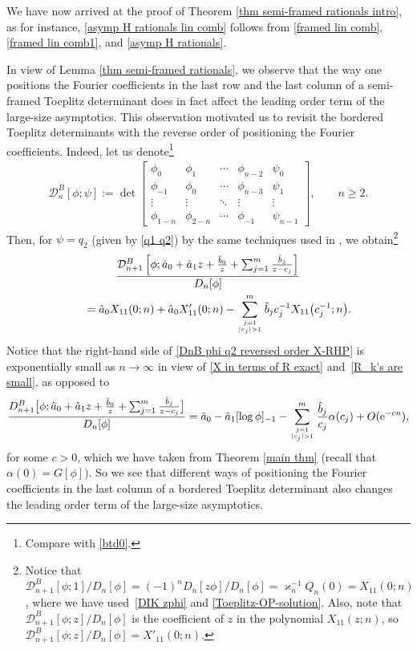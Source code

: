 \documentclass[pdftex]{sigma}
\numberwithin{equation}{section}
\newcommand{\al}{\alpha}
\begin{document}
We have now arrived at the proof of Theorem \ref{thm semi-framed rationals intro}, as for instance, \eqref{asymp H rationals lin comb} follows from \eqref{framed lin comb}, \eqref{framed lin comb1}, and \eqref{asymp H rationals}.
		
\begin{Remark}
In view of Lemma \ref{thm semi-framed rationals}, we observe that the way one positions the Fourier coefficients in the last row and the last column of a semi-framed Toeplitz determinant does in fact affect the leading order term of the large-size asymptotics. This observation motivated us to revisit the bordered Toeplitz determinants with the reverse order of positioning the Fourier coefficients. Indeed, let us denote\footnote{Compare with \eqref{btd0}.}
			\begin{gather*}%
				\mathcal{D}^{B}_{n}[\phi; \psi] := \det \begin{bmatrix}
					\phi_0& \phi_1 & \cdots & \phi_{n-2} & \psi_{0} \\
					\phi_{-1}& \phi_0 & \cdots & \phi_{n-3}&\psi_{1} \\
					\vdots & \vdots & \ddots & \vdots & \vdots\\
					\phi_{1-n} & \phi_{2-n} & \cdots & \phi_{-1}& \psi_{n-1}
				\end{bmatrix}, \qquad n \geq 2.
			\end{gather*}
			Then, for $\psi=q_2$ (given by \eqref{q1 q2}) by the same techniques used in \cite{BEGIL}, we obtain\footnote{Notice that $\mathcal{D}^{B}_{n+1}[\phi; 1]/D_n[\phi]=(-1)^{n}D_{n}[z\phi]/D_n[\phi] = \varkappa^{-1}_{n} Q_n(0) = X_{11}(0;n)$, where we have used~\eqref{DIK zphi} and \eqref{Toeplitz-OP-solution}. Also, note that $\mathcal{D}^{B}_{n+1}[\phi; z]/D_n[\phi]$ is the coefficient of $z$ in the polynomial $X_{11}(z;n)$, so $\mathcal{D}^{B}_{n+1}[\phi; z]/D_n[\phi] = X'_{11}(0;n)$.}
			\begin{gather}
				\frac{\mathcal{D}^{B}_{n+1}\left[\phi; \hat{a}_0+\hat{a}_1z+\tfrac{\hat{b}_0}{z}+	\sum_{j=1}^m \tfrac{\hat{b}_j}{z-c_j}\right]}{D_n[\phi]}\nonumber\\
\qquad = \hat{a}_0 X_{11}(0;n) + \hat{a}_0 X'_{11}(0;n) - \sum_{j=1 \atop |c_j|>1}^{m} \hat{b}_j c^{-1}_j X_{11}\big(c^{-1}_j;n\big).\label{DnB phi q2 reversed order X-RHP}
			\end{gather}
			Notice that the right-hand side of \eqref{DnB phi q2 reversed order X-RHP} is exponentially small as $n \to \infty$ in view of \eqref{X in terms of R exact} and~\eqref{R_k's are small}, as opposed to
			\begin{gather*}
				\frac{D^{B}_{n+1}\big[\phi; \hat{a}_0+\hat{a}_1z+\tfrac{\hat{b}_0}{z}+\sum_{j=1}^m \tfrac{\hat{b}_j}{z-c_j}\big]}{D_n[\phi]} = 			
				\hat{a}_0-\hat{a}_1[\log \phi]_{-1} -
				 \sum^{m}_{j=1 \atop |c_j|>1 } \frac{\hat{b}_j}{c_j} \al(c_j) + O({\rm e}^{-cn}),
			\end{gather*}
			for some $c>0$, which we have taken from Theorem \ref{main thm} (recall that $\al(0)=G[\phi]$). 	So we see that different ways of positioning the Fourier coefficients in the last column of a bordered Toeplitz determinant also changes the leading order term of the large-size asymptotics.
		\end{Remark}
		
\end{document}
